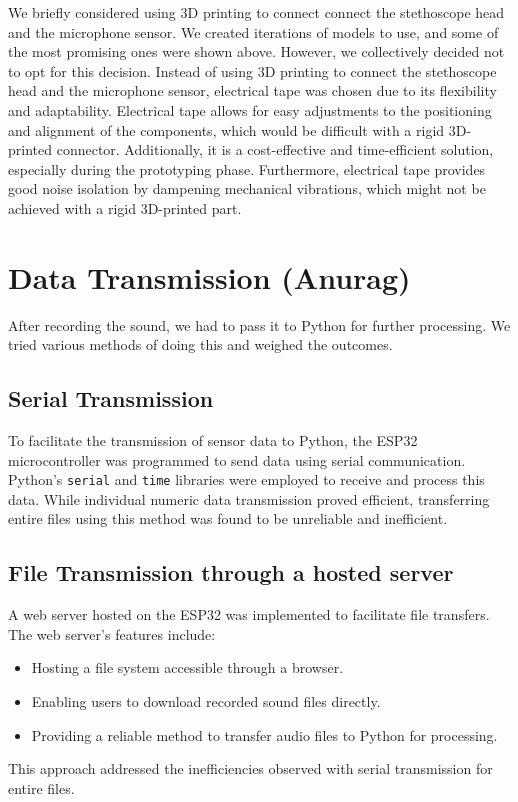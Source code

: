 \documentclass[conference]{IEEEtran}
\begin{document}
We briefly considered using 3D printing to connect connect the stethoscope head and the microphone sensor. We created iterations of models to use, and some of the most promising ones were shown above. However, we collectively decided not to opt for this decision. Instead of using 3D printing to connect the stethoscope head and the microphone sensor, electrical tape was chosen due to its flexibility and adaptability. Electrical tape allows for easy adjustments to the positioning and alignment of the components, which would be difficult with a rigid 3D-printed connector. Additionally, it is a cost-effective and time-efficient solution, especially during the prototyping phase. Furthermore, electrical tape provides good noise isolation by dampening mechanical vibrations, which might not be achieved with a rigid 3D-printed part.




\section{Data Transmission (Anurag)}
After recording the sound, we had to pass it to Python for further processing. We tried various methods of doing this and weighed the outcomes.
	
\subsection{Serial Transmission}
To facilitate the transmission of sensor data to Python, the ESP32 microcontroller was programmed to send data using serial communication. Python's \texttt{serial} and \texttt{time} libraries were employed to receive and process this data. While individual numeric data transmission proved efficient, transferring entire files using this method was found to be unreliable and inefficient.

\subsection{File Transmission through a hosted server}
A web server hosted on the ESP32 was implemented to facilitate file transfers. The web server’s features include:
\begin{itemize}
    \item Hosting a file system accessible through a browser.
    \item Enabling users to download recorded sound files directly.
    \item Providing a reliable method to transfer audio files to Python for processing.
\end{itemize}
This approach addressed the inefficiencies observed with serial transmission for entire files.
\end{document}
